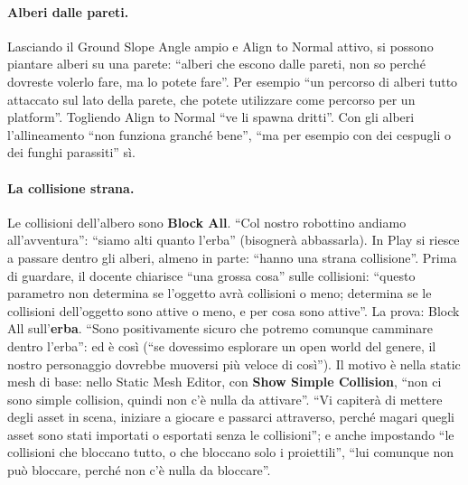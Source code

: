 \paragraph{Alberi dalle pareti.} Lasciando il Ground Slope Angle ampio e Align to Normal
attivo, si possono piantare alberi su una parete: ``alberi che escono dalle pareti, non so
perché dovreste volerlo fare, ma lo potete fare''. Per esempio ``un percorso di alberi tutto
attaccato sul lato della parete, che potete utilizzare come percorso per un platform''.
Togliendo Align to Normal ``ve li spawna dritti''. Con gli alberi l'allineamento ``non funziona
granché bene'', ``ma per esempio con dei cespugli o dei funghi parassiti'' sì.

\paragraph{La collisione strana.} Le collisioni dell'albero sono \textbf{Block All}. ``Col
nostro robottino andiamo all'avventura'': ``siamo alti quanto l'erba'' (bisognerà abbassarla).
In Play si riesce a passare dentro gli alberi, almeno in parte: ``hanno una strana
collisione''. Prima di guardare, il docente chiarisce ``una grossa cosa'' sulle collisioni:
``questo parametro non determina se l'oggetto avrà collisioni o meno; determina se le
collisioni dell'oggetto sono attive o meno, e per cosa sono attive''. La prova: Block All
sull'\textbf{erba}. ``Sono positivamente sicuro che potremo comunque camminare dentro l'erba'':
ed è così (``se dovessimo esplorare un open world del genere, il nostro personaggio dovrebbe
muoversi più veloce di così''). Il motivo è nella static mesh di base: nello Static Mesh
Editor, con \textbf{Show Simple Collision}, ``non ci sono simple collision, quindi non c'è
nulla da attivare''. ``Vi capiterà di mettere degli asset in scena, iniziare a giocare e
passarci attraverso, perché magari quegli asset sono stati importati o esportati senza le
collisioni''; e anche impostando ``le collisioni che bloccano tutto, o che bloccano solo i
proiettili'', ``lui comunque non può bloccare, perché non c'è nulla da bloccare''.

